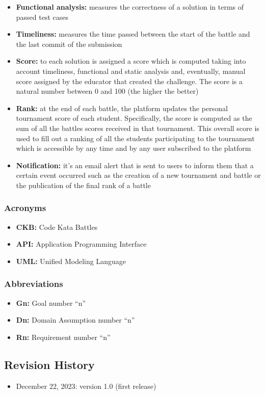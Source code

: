 \begin{itemize}
    \item {\textbf{Functional analysis:} measures the correctness of a solution in terms of passed test cases}
    \item {\textbf{Timeliness:} measures the time passed between the start of the battle and the last commit of the submission}
    \item {\textbf{Score:} to each solution is assigned a score which is computed taking into account timeliness, functional and static analysis and, eventually, manual score assigned by the educator that created the challenge. The score is a natural number between 0 and 100 (the higher the better)}
    \item {\textbf{Rank:} at the end of each battle, the platform updates the personal tournament score of each student. Specifically, the score is computed as the sum of all the battles scores received in that tournament. This overall score is used to fill out a ranking of all the students participating to the tournament which is accessible by any time and by any user subscribed to the platform}
    \item {\textbf{Notification:} it's an  email alert that is sent to users to inform them that a certain event occurred such as the creation of a new tournament and battle or the publication of the final rank of a battle}

\end{itemize}
\subsubsection{Acronyms}
\begin{itemize}
    \item {\textbf{CKB:} Code Kata Battles}
    \item {\textbf{API:} Application Programming Interface}
    \item {\textbf{UML:} Unified Modeling Language}
\end{itemize}
\subsubsection{Abbreviations}
\begin{itemize}
    \item {\textbf{Gn:} Goal number “n”}
    \item {\textbf{Dn:} Domain Assumption number “n”}
    \item {\textbf{Rn:} Requirement number “n”}
\end{itemize}
\subsection{Revision History}
\begin{itemize}
    \item December 22, 2023: version 1.0 (first release)
\end{itemize}
